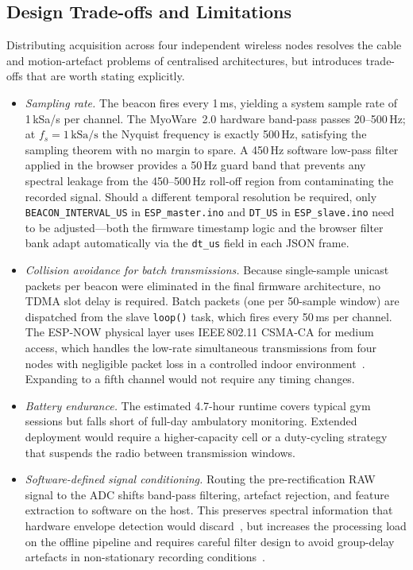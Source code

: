 \subsection{Design Trade-offs and Limitations}

Distributing acquisition across four independent wireless nodes resolves the cable and motion-artefact problems of centralised architectures, but introduces trade-offs that are worth stating explicitly.

\begin{itemize}

  \item \textit{Sampling rate.} The beacon fires every 1\,ms, yielding a system sample rate of 1\,kSa/s per channel. The MyoWare~2.0 hardware band-pass passes 20--500\,Hz; at $f_s = 1\,\text{kSa/s}$ the Nyquist frequency is exactly 500\,Hz, satisfying the sampling theorem with no margin to spare. A 450\,Hz software low-pass filter applied in the browser provides a 50\,Hz guard band that prevents any spectral leakage from the 450--500\,Hz roll-off region from contaminating the recorded signal. Should a different temporal resolution be required, only \texttt{BEACON\_INTERVAL\_US} in \texttt{ESP\_master.ino} and \texttt{DT\_US} in \texttt{ESP\_slave.ino} need to be adjusted---both the firmware timestamp logic and the browser filter bank adapt automatically via the \texttt{dt\_us} field in each JSON frame.

  \item \textit{Collision avoidance for batch transmissions.} Because single-sample unicast packets per beacon were eliminated in the final firmware architecture, no TDMA slot delay is required. Batch packets (one per 50-sample window) are dispatched from the slave \texttt{loop()} task, which fires every 50\,ms per channel. The ESP-NOW physical layer uses IEEE\,802.11 CSMA-CA for medium access, which handles the low-rate simultaneous transmissions from four nodes with negligible packet loss in a controlled indoor environment~\cite{george2023indoor}. Expanding to a fifth channel would not require any timing changes.

  \item \textit{Battery endurance.} The estimated 4.7-hour runtime covers typical gym sessions but falls short of full-day ambulatory monitoring. Extended deployment would require a higher-capacity cell or a duty-cycling strategy that suspends the radio between transmission windows.

  \item \textit{Software-defined signal conditioning.} Routing the pre-rectification RAW signal to the ADC shifts band-pass filtering, artefact rejection, and feature extraction to software on the host. This preserves spectral information that hardware envelope detection would discard~\cite{phinyomark2018feature}, but increases the processing load on the offline pipeline and requires careful filter design to avoid group-delay artefacts in non-stationary recording conditions~\cite{emg_classification2026}.


\end{itemize}
